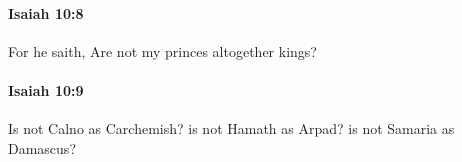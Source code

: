 		\paragraph{Isaiah 10:8} %
			\label{ISAIAH-10-8}

			For he saith, Are not my princes altogether kings?


		\paragraph{Isaiah 10:9} %
			\label{ISAIAH-10-9}

			Is not Calno as Carchemish? is not Hamath as Arpad? is not Samaria as Damascus?


